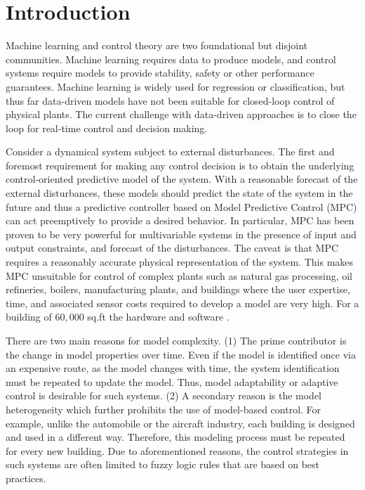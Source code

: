 \section{Introduction}


Machine learning and control theory are two foundational but disjoint communities.
Machine learning requires data to produce models, and control systems require models to provide stability, safety or other performance guarantees.
Machine learning is widely used for regression or classification, but thus far data-driven models have not been suitable for closed-loop control of physical plants.
The current challenge with data-driven approaches is to close the loop for real-time control and decision making.

Consider a dynamical system subject to external disturbances.
The first and foremost requirement for making any control decision is to obtain the underlying control-oriented predictive model of the system.
With a reasonable forecast of the external disturbances, these models should predict the state of the system in the future and thus a predictive controller based on Model Predictive Control (MPC) can act preemptively to provide a desired behavior.
In particular, MPC has been proven to be very powerful for multivariable systems in the presence of input and output constraints, and forecast of the disturbances.
The caveat is that MPC requires a reasonably accurate physical representation of the system.
This makes MPC unsuitable for control of complex plants such as natural gas processing, oil refineries, boilers, manufacturing plants, and buildings where the user expertise, time, and associated sensor costs required to develop a model are very high. 
For a building of \(60,000\) sq.ft the hardware and software \cite{Sturzenegger2016}.

There are two main reasons for model complexity. 
(1) The prime contributor is the change in model properties over time. Even if the model is identified once via an expensive route, as the model changes with time, the system identification must be repeated to update the model. Thus, model adaptability or adaptive control is desirable for such systems. 
(2) A secondary reason is the model heterogeneity which further prohibits the use of model-based control. For example, unlike the automobile or the aircraft industry, each building is designed and used in a different way. Therefore, this modeling process must be repeated for every new building. 
Due to aforementioned reasons, the control strategies in such systems are often limited to fuzzy logic rules that are based on best practices. 

